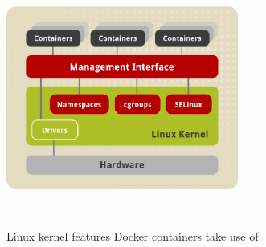 \begin{figure}
\includegraphics[height=3in, width=3in]{dockerLinuxKernel}
\caption{Linux kernel features Docker containers take use of}
\cite{DockerLinuxKernelPic}
\label{fig:DockerLinuxKernelPic}
\end{figure}

